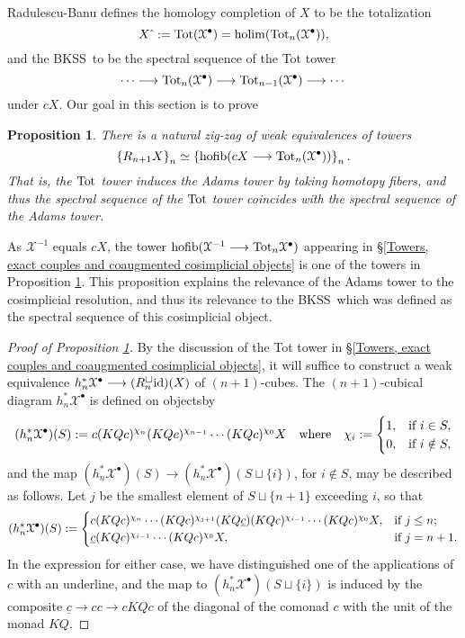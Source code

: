 \documentclass[11pt]{amsart} \renewcommand{\baselinestretch}{1.2}
\theoremstyle{plain}
\newtheorem{prop}[thm]{Proposition}
\numberwithin{equation}{section} %
\theoremstyle{plain}
\newtheorem{prop}[thm]{Proposition}
\numberwithin{equation}{chapter} %
\DeclareMathOperator*{\holim}{holim}
\DeclareMathOperator*{\hofib}{hofib}
\renewcommand{\to}{\longrightarrow}
\newcommand{\calx}{\mathcal{X}}
\newcommand{\Id}{\mathrm{id}}
\newcommand{\plainD}{R}
\newcommand{\BKSS}{BKSS}
\begin{document}
\begin{Bousfield-Kan spectral sequence}
Radulescu-Banu defines the homology completion of $X$ to be the totalization
\[X\hat{\ }:=\textup{Tot}(\calx^\bullet)=\holim (\textup{Tot}_n(\calx^\bullet)),\]
and the \BKSS\ to be the spectral sequence of the Tot tower
\[\cdots \to\textup{Tot}_n(\calx^\bullet)\to \textup{Tot}_{n-1}(\calx^\bullet)\to\cdots \]
under $cX$. Our goal in this section is to prove
\begin{prop}
\label{towerIdentification}
There is a natural zig-zag of weak equivalences of towers \[\left\{\plainD_{n+1}X\right\}_n\simeq\left\{\hofib(cX\to\textup{Tot}_{n}(\calx^\bullet))\right\}_n.\] That is,  the $\textup{Tot}$ tower induces the Adams tower by taking homotopy fibers, and thus the spectral sequence of the $\textup{Tot}$ tower coincides with the spectral sequence of the Adams tower.
\end{prop}
\noindent As $\calx^{-1}$ equals $cX$, the tower $\hofib(\calx^{-1}\to\textup{Tot}_n\calx^{\bullet})$ appearing in \S\ref{Towers, exact couples and coaugmented cosimplicial objects} is one of the towers in Proposition \ref{towerIdentification}. This proposition explains the relevance of the Adams tower to the cosimplicial resolution, and thus its relevance to the \BKSS\ which was defined as the spectral sequence of this cosimplicial object.
\begin{proof}[Proof of Proposition \ref{towerIdentification}] 
By the discussion of the Tot tower in \S\ref{Towers, exact couples and coaugmented cosimplicial objects}, it will suffice to construct a weak equivalence $h_n^*\calx^\bullet\to (\plainD_n^{\smash{\square}}\Id  )(X)$ of $(n+1)$-cubes. The $(n+1)$-cubical diagram $h_n^*\calx^\bullet$ is defined on objectsby
\[(h_n^*\calx^\bullet)(S):= c(KQc)^{\chi_{n}}(KQc)^{\chi_{n-1}}\cdots (KQc)^{\chi_0}X\quad \textup{where}\quad \chi_i:=\begin{cases}
1,&\textup{if }i\in S,\\
0,&\textup{if }i\notin S,
\end{cases}
\]
and the map $(h_n^*\calx^\bullet)(S)\to (h_n^*\calx^\bullet)(S\sqcup\{i\})$, for $i\notin S$, may be described as follows. Let $j$ be the smallest element of $S\sqcup\{n+1\}$ exceeding $i$, so that
\[(h_n^*\calx^\bullet)(S):= \begin{cases}
c(KQc)^{\chi_{n}}\cdots (KQc)^{\chi_{j+1}}(KQ\underline{c})(KQc)^{\chi_{i-1}}\cdots (KQc)^{\chi_0}X,&\textup{if }j\leq n;\\
\underline{c}(KQc)^{\chi_{i-1}}\cdots (KQc)^{\chi_0}X,&\textup{if }j=n+1.
\end{cases}
\]
In the expression for either case, we have distinguished one of the applications of $c$ with an underline, and the map to $(h_n^*\calx^\bullet)(S\sqcup\{i\})$ is induced by the composite $\underline{c}\to cc\to cKQc$ of the diagonal of the comonad $c$ with the unit of the monad $KQ$. 


\end{proof}
\end{Bousfield-Kan spectral sequence}
\end{document}
